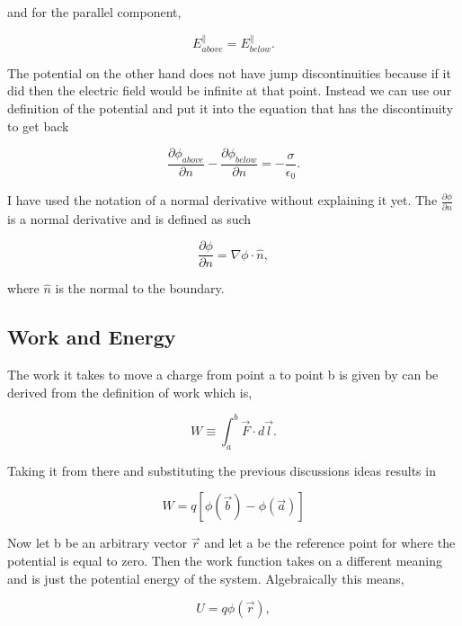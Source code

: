 \documentclass[preprint, review,12pt]{elsarticle}
\def\.{\cdot}
\begin{document}
and for the parallel component,

\begin{equation}
    E_{above}^\parallel = E_{below}^\parallel.
\end{equation}

The potential on the other hand does not have jump discontinuities because if it did then the electric field would be infinite at that point. Instead we can use our definition of the potential and put it into the equation that has the discontinuity to get back

\begin{equation}
    \frac{\partial \phi_{above}}{\partial n} - \frac{\partial \phi_{below}}{\partial n} = -\frac{\sigma}{\epsilon_0}.
\end{equation}

I have used the notation of a normal derivative without explaining it yet. The $\frac{\partial \phi}{\partial n}$ is a normal derivative and is defined as such

\begin{equation}
    \frac{\partial \phi}{\partial n} = \nabla \phi \. \hat{n},
\end{equation}

where $\hat{n}$ is the normal to the boundary. 


\subsection{Work and Energy}

The work it takes to move a charge from point a to point b is given by can be derived from the definition of work which is,

\begin{equation}
    W \equiv \int_a^b \vec{F}\. d\vec{l}.
\end{equation}

Taking it from there and substituting the previous discussions ideas results in

\begin{equation}
    W = q[\phi(\vec{b})-\phi(\vec{a})]
\end{equation}

Now let b be an arbitrary vector $\vec{r}$ and let a be the reference point for where the potential is equal to zero. Then the work function takes on a different meaning and is just the potential energy of the system. Algebraically this means,

\begin{equation}
    U = q\phi(\vec{r}),
\end{equation}
\end{document}
